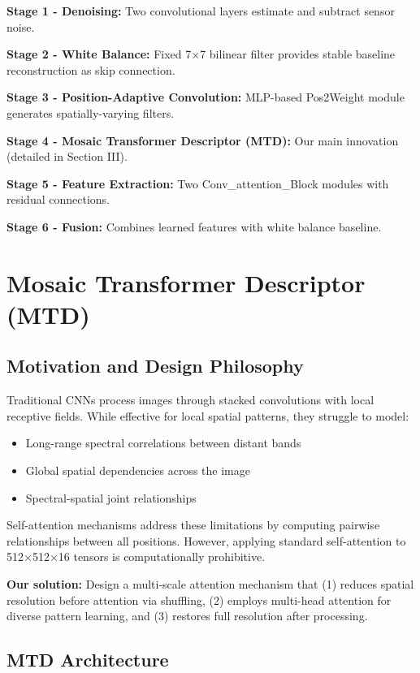 \documentclass[conference]{IEEEtran}
\begin{document}
\textbf{Stage 1 - Denoising:} Two convolutional layers estimate and subtract sensor noise.

\textbf{Stage 2 - White Balance:} Fixed 7×7 bilinear filter provides stable baseline reconstruction as skip connection.

\textbf{Stage 3 - Position-Adaptive Convolution:} MLP-based Pos2Weight module generates spatially-varying filters.

\textbf{Stage 4 - Mosaic Transformer Descriptor (MTD):} Our main innovation (detailed in Section III).

\textbf{Stage 5 - Feature Extraction:} Two Conv\_attention\_Block modules with residual connections.

\textbf{Stage 6 - Fusion:} Combines learned features with white balance baseline.



\section{Mosaic Transformer Descriptor (MTD)}

\subsection{Motivation and Design Philosophy}

Traditional CNNs process images through stacked convolutions with local receptive fields. While effective for local spatial patterns, they struggle to model:
\begin{itemize}
    \item Long-range spectral correlations between distant bands
    \item Global spatial dependencies across the image
    \item Spectral-spatial joint relationships
\end{itemize}

Self-attention mechanisms address these limitations by computing pairwise relationships between all positions. However, applying standard self-attention to 512×512×16 tensors is computationally prohibitive.

\textbf{Our solution:} Design a multi-scale attention mechanism that (1) reduces spatial resolution before attention via shuffling, (2) employs multi-head attention for diverse pattern learning, and (3) restores full resolution after processing.

\subsection{MTD Architecture}
\end{document}
